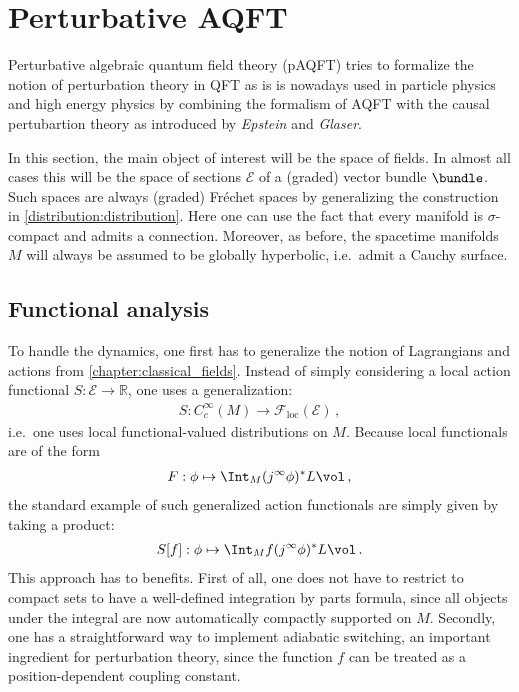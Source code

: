 \section{Perturbative AQFT}

    Perturbative algebraic quantum field theory (pAQFT) tries to formalize the notion of perturbation theory in QFT as is is nowadays used in particle physics and high energy physics by combining the formalism of AQFT with the causal pertubartion theory as introduced by \textit{Epstein} and \textit{Glaser}.

    In this section, the main object of interest will be the space of fields. In almost all cases this will be the space of sections $\mathcal{E}$ of a (graded) vector bundle $\bundle$. Such spaces are always (graded) Fr\'echet spaces by generalizing the construction in \cref{distribution:distribution}. Here one can use the fact that every manifold is $\sigma$-compact and admits a connection. Moreover, as before, the spacetime manifolds $M$ will always be assumed to be globally hyperbolic, i.e.~admit a Cauchy surface.

\subsection{Functional analysis}

    To handle the dynamics, one first has to generalize the notion of Lagrangians and actions from \cref{chapter:classical_fields}. Instead of simply considering a local action functional $S:\mathcal{E}\rightarrow\mathbb{R}$, one uses a generalization:
    \begin{gather}
        S:C^\infty_c(M)\rightarrow\mathcal{F}_{\text{loc}}(\mathcal{E})\,,
    \end{gather}
    i.e.~one uses local functional-valued distributions on $M$. Because local functionals are of the form
    \begin{gather}
        F:\phi\mapsto\Int_M (j^\infty\phi)^*L\vol\,,
    \end{gather}
    the standard example of such generalized action functionals are simply given by taking a product:
    \begin{gather}
        S[f]:\phi\mapsto\Int_Mf(j^\infty\phi)^*L\vol\,.
    \end{gather}
    This approach has to benefits. First of all, one does not have to restrict to compact sets to have a well-defined integration by parts formula, since all objects under the integral are now automatically compactly supported on $M$. Secondly, one has a straightforward way to implement adiabatic switching, an important ingredient for perturbation theory, since the function $f$ can be treated as a position-dependent coupling constant.

